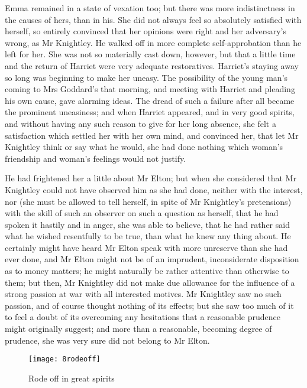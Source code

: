 Emma remained in a state of vexation too; but there was more indistinctness in the causes of hers, than in his. She did not always feel so absolutely satisfied with herself, so entirely convinced that her opinions were right and her adversary's wrong, as Mr Knightley. He walked off in more complete self-approbation than he left for her. She was not so materially cast down, however, but that a little time and the return of Harriet were very adequate restoratives. Harriet's staying away so long was beginning to make her uneasy. The possibility of the young man's coming to Mrs Goddard's that morning, and meeting with Harriet and pleading his own cause, gave alarming ideas. The dread of such a failure after all became the prominent uneasiness; and when Harriet appeared, and in very good spirits, and without having any such reason to give for her long absence, she felt a satisfaction which settled her with her own mind, and convinced her, that let Mr Knightley think or say what he would, she had done nothing which woman's friendship and woman's feelings would not justify.

He had frightened her a little about Mr Elton; but when she considered that Mr Knightley could not have observed him as she had done, neither with the interest, nor (she must be allowed to tell herself, in spite of Mr Knightley's pretensions) with the skill of such an observer on such a question as herself, that he had spoken it hastily and in anger, she was able to believe, that he had rather said what he wished resentfully to be true, than what he knew any thing about. He certainly might have heard Mr Elton speak with more unreserve than she had ever done, and Mr Elton might not be of an imprudent, inconsiderate disposition as to money matters; he might naturally be rather attentive than otherwise to them; but then, Mr Knightley did not make due allowance for the influence of a strong passion at war with all interested motives. Mr Knightley saw no such passion, and of course thought nothing of its effects; but she saw too much of it to feel a doubt of its overcoming any hesitations that a reasonable prudence might originally suggest; and more than a reasonable, becoming degree of prudence, she was very sure did not belong to Mr Elton.

\begin{figure}[tbph]
\centering
\texttt{[image: 8rodeoff]}
\caption{Rode off in great spirits}
\end{figure}

